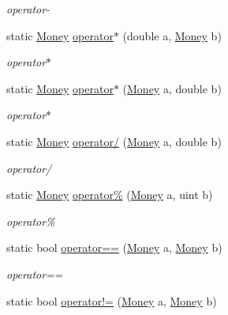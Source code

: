 \begin{DoxyCompactItemize}
\begin{DoxyCompactList}\small\item\em operator-\/ \end{DoxyCompactList}\item 
static \mbox{\hyperlink{struct_f_b_a_1_1_money}{Money}} \mbox{\hyperlink{struct_f_b_a_1_1_money_a1c5231c36006792a35bad7e4dbfe6d45}{operator$\ast$}} (double a, \mbox{\hyperlink{struct_f_b_a_1_1_money}{Money}} b)
\begin{DoxyCompactList}\small\item\em operator$\ast$ \end{DoxyCompactList}\item 
static \mbox{\hyperlink{struct_f_b_a_1_1_money}{Money}} \mbox{\hyperlink{struct_f_b_a_1_1_money_acf6a7e573a83201a4af2d3d8314aea94}{operator$\ast$}} (\mbox{\hyperlink{struct_f_b_a_1_1_money}{Money}} a, double b)
\begin{DoxyCompactList}\small\item\em operator$\ast$ \end{DoxyCompactList}\item 
static \mbox{\hyperlink{struct_f_b_a_1_1_money}{Money}} \mbox{\hyperlink{struct_f_b_a_1_1_money_ab02254b5b9522985c3776b8de6161660}{operator/}} (\mbox{\hyperlink{struct_f_b_a_1_1_money}{Money}} a, double b)
\begin{DoxyCompactList}\small\item\em operator/ \end{DoxyCompactList}\item 
static \mbox{\hyperlink{struct_f_b_a_1_1_money}{Money}} \mbox{\hyperlink{struct_f_b_a_1_1_money_aa4a30ed94810edff28d26255696b2fbc}{operator\%}} (\mbox{\hyperlink{struct_f_b_a_1_1_money}{Money}} a, uint b)
\begin{DoxyCompactList}\small\item\em operator\% \end{DoxyCompactList}\item 
static bool \mbox{\hyperlink{struct_f_b_a_1_1_money_ad41523499a6a5cb80be9a0b59921bb80}{operator==}} (\mbox{\hyperlink{struct_f_b_a_1_1_money}{Money}} a, \mbox{\hyperlink{struct_f_b_a_1_1_money}{Money}} b)
\begin{DoxyCompactList}\small\item\em operator== \end{DoxyCompactList}\item 
static bool \mbox{\hyperlink{struct_f_b_a_1_1_money_a14f2d302898b1e0111ec2ad626721274}{operator!=}} (\mbox{\hyperlink{struct_f_b_a_1_1_money}{Money}} a, \mbox{\hyperlink{struct_f_b_a_1_1_money}{Money}} b)

\end{DoxyCompactItemize}
